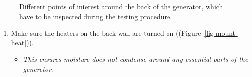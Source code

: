 \documentclass[
  12pt,
]{report}
\providecommand{\tightlist}{%
  \setlength{\itemsep}{0pt}\setlength{\parskip}{0pt}}\usepackage{longtable,booktabs,array}
\begin{document}
\begin{figure}[H]

\begin{minipage}[t]{0.33\linewidth}

{\centering 


}

\end{minipage}%
%
\begin{minipage}[t]{0.33\linewidth}

{\centering 


}

\end{minipage}%
%
\begin{minipage}[t]{0.33\linewidth}

{\centering 


}

\end{minipage}%

\caption{\label{fig-generator}Different points of interest around the
back of the generator, which have to be inspected during the testing
procedure.}

\end{figure}

\begin{enumerate}
\def\labelenumi{\arabic{enumi}.}
\setcounter{enumi}{4}
\tightlist
\item
  Make sure the heaters on the back wall are turned on
  ((Figure~\ref{fig-mount-heat})).

  \begin{itemize}
  \tightlist
  \item
    \emph{This ensures moisture does not condense around any essential
    parts of the generator}.
  \end{itemize}
\end{enumerate}
\end{document}
